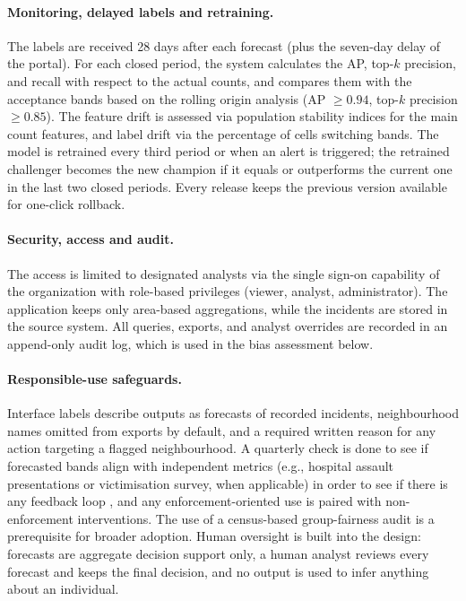 \documentclass[11pt,a4paper]{report}
\begin{document}
\paragraph{Monitoring, delayed labels and retraining.} The labels are received 28 days after each forecast (plus the seven-day delay of the portal). For each closed period, the system calculates the AP, top-$k$ precision, and recall with respect to the actual counts, and compares them with the acceptance bands based on the rolling origin analysis (AP $\geq 0.94$, top-$k$ precision $\geq 0.85$). The feature drift is assessed via population stability indices for the main count features, and label drift via the percentage of cells switching bands. The model is retrained every third period or when an alert is triggered; the retrained challenger becomes the new champion if it equals or outperforms the current one in the last two closed periods. Every release keeps the previous version available for one-click rollback.

\paragraph{Security, access and audit.} The access is limited to designated analysts via the single sign-on capability of the organization with role-based privileges (viewer, analyst, administrator). The application keeps only area-based aggregations, while the incidents are stored in the source system. All queries, exports, and analyst overrides are recorded in an append-only audit log, which is used in the bias assessment below.

\paragraph{Responsible-use safeguards.} Interface labels describe outputs as forecasts of recorded incidents, neighbourhood names omitted from exports by default, and a required written reason for any action targeting a flagged neighbourhood. A quarterly check is done to see if forecasted bands align with independent metrics (e.g., hospital assault presentations or victimisation survey, when applicable) in order to see if there is any feedback loop \citep{ensign2018}, and any enforcement-oriented use is paired with non-enforcement interventions. The use of a census-based group-fairness audit is a prerequisite for broader adoption. Human oversight is built into the design: forecasts are aggregate decision support only, a human analyst reviews every forecast and keeps the final decision, and no output is used to infer anything about an individual.
\end{document}
